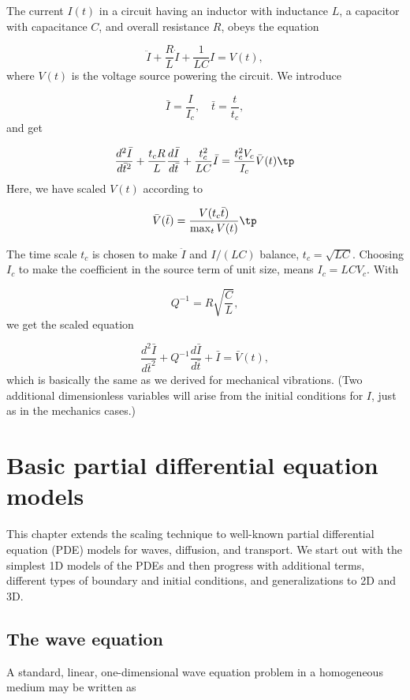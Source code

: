 \documentclass[graybox,envcountchap,sectrefs,final]{svmonodo}
\begin{document}
The current $I(t)$ in a
circuit having an inductor with inductance $L$, a capacitor with
capacitance $C$, and overall resistance $R$, obeys the equation

\begin{equation}
\ddot I + \frac{R}{L}\dot I + \frac{1}{LC}I =  V(t),
\end{equation}
where $V(t)$ is the voltage source powering the circuit.
We introduce

\[ \bar I=\frac{I}{I_c},\quad \bar t = \frac{t}{t_c},\]
and get

\[ \frac{d^2\bar I}{d\bar t^2} + \frac{t_c R}{L}\frac{d\bar I}{d\bar t}
+ \frac{t_c^2}{LC}\bar I = \frac{t_c^2V_c}{I_c} \bar V(t)\tp\]
Here, we have scaled $V(t)$ according to

\[ \bar V(\bar t) = \frac{V(t_c\bar t)}{\max_t V(t)}\tp\]

The time scale $t_c$ is chosen to make $\ddot I$ and $I/(LC)$ balance,
$t_c = \sqrt{LC}$.
Choosing $I_c$ to make the coefficient in the source term of unit size,
means $I_c = LCV_c$.
With

\[ Q^{-1} = R\sqrt{\frac{C}{L}},\]
we get the scaled equation

\begin{equation}
\frac{d^2\bar I}{d\bar t^2} + Q^{-1}\frac{d\bar I}{d\bar t}
+ \bar I = \bar V(t),
\end{equation}
which is basically the same as we derived for mechanical vibrations.
(Two additional dimensionless variables will arise from the initial
conditions for $I$, just as in the mechanics cases.)


\chapter{Basic partial differential equation models}

This chapter extends the scaling technique to well-known partial differential
equation (PDE) models for waves, diffusion, and transport.
We start out with the simplest 1D models of the PDEs and then progress
with additional terms, different types of boundary and initial conditions,
and generalizations to 2D and 3D.

\section{The wave equation}
\label{sec:scale:wave}

A standard, linear, one-dimensional wave equation problem
in a homogeneous medium may be written as
\end{document}
